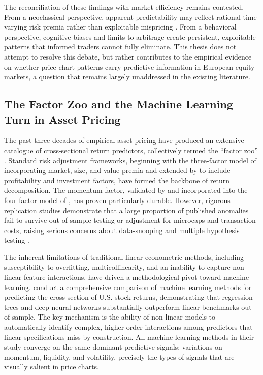 The reconciliation of these findings with market efficiency remains contested. From a neoclassical perspective, apparent predictability may reflect rational time-varying risk premia rather than exploitable mispricing \parencite{fama1991}. From a behavioral perspective, cognitive biases and limits to arbitrage create persistent, exploitable patterns that informed traders cannot fully eliminate. This thesis does not attempt to resolve this debate, but rather contributes to the empirical evidence on whether price chart patterns carry predictive information in European equity markets, a question that remains largely unaddressed in the existing literature.

\subsection{The Factor Zoo and the Machine Learning Turn in Asset Pricing}

The past three decades of empirical asset pricing have produced an extensive catalogue of cross-sectional return predictors, collectively termed the ``factor zoo'' \parencite{Gu2020}. Standard risk adjustment frameworks, beginning with the three-factor model of \textcite{famafrench1993} incorporating market, size, and value premia and extended by \textcite{Fama2015} to include profitability and investment factors, have formed the backbone of return decomposition. The momentum factor, validated by \textcite{Jegadeesh1993} and incorporated into the four-factor model of \textcite{Carhart1997}, has proven particularly durable. However, rigorous replication studies demonstrate that a large proportion of published anomalies fail to survive out-of-sample testing or adjustment for microcaps and transaction costs, raising serious concerns about data-snooping and multiple hypothesis testing \parencite{Hou2020}.

The inherent limitations of traditional linear econometric methods, including susceptibility to overfitting, multicollinearity, and an inability to capture non-linear feature interactions, have driven a methodological pivot toward machine learning. \textcite{Gu2020} conduct a comprehensive comparison of machine learning methods for predicting the cross-section of U.S. stock returns, demonstrating that regression trees and deep neural networks substantially outperform linear benchmarks out-of-sample. The key mechanism is the ability of non-linear models to automatically identify complex, higher-order interactions among predictors that linear specifications miss by construction. All machine learning methods in their study converge on the same dominant predictive signals: variations on momentum, liquidity, and volatility, precisely the types of signals that are visually salient in price charts.

